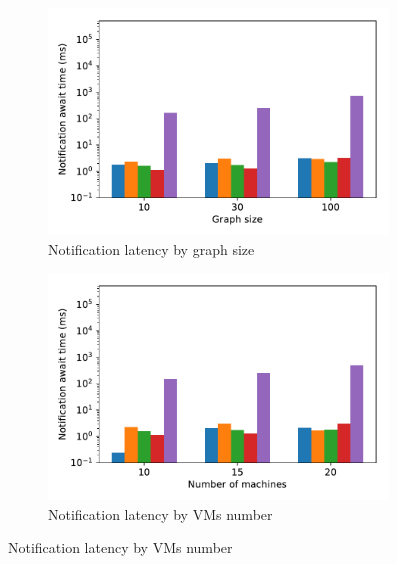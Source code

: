 \begin{figure}[t!]
    \begin{subfigure}[b]{0.3\textwidth}
            \includegraphics[width=0.99\textwidth]{Chapters/Tracker/pics/notification_await_time_by_graph_size_bars.pdf}
            \caption{Notification latency by graph size}
            \label{notification_graph}
    \end{subfigure}
    \hspace{5mm}
    \begin{subfigure}[b]{0.3\textwidth}
            \includegraphics[width=0.99\textwidth]{Chapters/Tracker/pics/notification_await_time_by_number_of_machines_bars.pdf}
            \caption{Notification latency by VMs number}
            \label{notification_machines}
    \end{subfigure}
    \hspace{5mm}

\end{figure}
